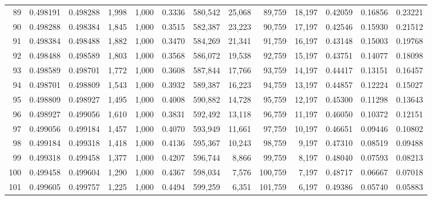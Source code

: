 \begin{tabular}{rrrrrrrrrrrrr}
89  &  0.498191 &  0.498288 &   1,998 &  1,000 &                                     0.3336 &  580,542 &   25,068 &   89,759 &   18,197 &  0.42059 &  0.16856 &  0.23221 \\
90  &  0.498288 &  0.498384 &   1,845 &  1,000 &                                     0.3515 &  582,387 &   23,223 &   90,759 &   17,197 &  0.42546 &  0.15930 &  0.21512 \\
91  &  0.498384 &  0.498488 &   1,882 &  1,000 &                                     0.3470 &  584,269 &   21,341 &   91,759 &   16,197 &  0.43148 &  0.15003 &  0.19768 \\
92  &  0.498488 &  0.498589 &   1,803 &  1,000 &                                     0.3568 &  586,072 &   19,538 &   92,759 &   15,197 &  0.43751 &  0.14077 &  0.18098 \\
93  &  0.498589 &  0.498701 &   1,772 &  1,000 &                                     0.3608 &  587,844 &   17,766 &   93,759 &   14,197 &  0.44417 &  0.13151 &  0.16457 \\
94  &  0.498701 &  0.498809 &   1,543 &  1,000 &                                     0.3932 &  589,387 &   16,223 &   94,759 &   13,197 &  0.44857 &  0.12224 &  0.15027 \\
95  &  0.498809 &  0.498927 &   1,495 &  1,000 &                                     0.4008 &  590,882 &   14,728 &   95,759 &   12,197 &  0.45300 &  0.11298 &  0.13643 \\
96  &  0.498927 &  0.499056 &   1,610 &  1,000 &                                     0.3831 &  592,492 &   13,118 &   96,759 &   11,197 &  0.46050 &  0.10372 &  0.12151 \\
97  &  0.499056 &  0.499184 &   1,457 &  1,000 &                                     0.4070 &  593,949 &   11,661 &   97,759 &   10,197 &  0.46651 &  0.09446 &  0.10802 \\
98  &  0.499184 &  0.499318 &   1,418 &  1,000 &                                     0.4136 &  595,367 &   10,243 &   98,759 &    9,197 &  0.47310 &  0.08519 &  0.09488 \\
99  &  0.499318 &  0.499458 &   1,377 &  1,000 &                                     0.4207 &  596,744 &    8,866 &   99,759 &    8,197 &  0.48040 &  0.07593 &  0.08213 \\
100 &  0.499458 &  0.499604 &   1,290 &  1,000 &                                     0.4367 &  598,034 &    7,576 &  100,759 &    7,197 &  0.48717 &  0.06667 &  0.07018 \\
101 &  0.499605 &  0.499757 &   1,225 &  1,000 &                                     0.4494 &  599,259 &    6,351 &  101,759 &    6,197 &  0.49386 &  0.05740 &  0.05883 \\

\end{tabular}
